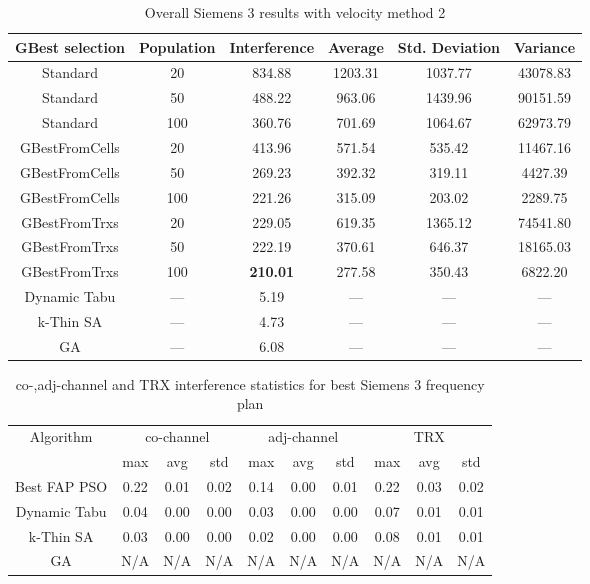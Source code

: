 \begin{table}[H]
\centering
	\begin{tabular}{cccccc}
	\toprule
    GBest selection & Population & Interference & Average & Std. Deviation & Variance \\
    \midrule
    Standard & 20 & 834.88 & 1203.31 & 1037.77 & 43078.83\\
    Standard & 50 & 488.22 & 963.06 & 1439.96 & 90151.59\\
    Standard & 100 & 360.76 & 701.69 & 1064.67 & 62973.79\\
    GBestFromCells & 20 & 413.96 & 571.54 & 535.42 & 11467.16\\
    GBestFromCells & 50 & 269.23 & 392.32 & 319.11 & 4427.39\\
    GBestFromCells & 100 & 221.26 & 315.09 & 203.02 & 2289.75\\
    GBestFromTrxs & 20 & 229.05 & 619.35 & 1365.12 & 74541.80\\
    GBestFromTrxs & 50 & 222.19 & 370.61 & 646.37 & 18165.03\\
    GBestFromTrxs & 100 & \textbf{210.01} & 277.58 & 350.43 & 6822.20\\
    \midrule
    Dynamic Tabu & --- & 5.19 & --- & --- & --- \\
    k-Thin SA & --- & 4.73 & --- & --- & --- \\
    GA & --- & 6.08 & --- & --- & --- \\
    \bottomrule
	\end{tabular}
\caption{Overall Siemens 3 results with velocity method 2}
\label{tab:siem3m2}
\end{table}
\begin{table}[H]
\centering
	\begin{tabular}{cccccccccc}
	\toprule
    Algorithm & \multicolumn{3}{c}{co-channel} & \multicolumn{3}{c}{adj-channel} & \multicolumn{3}{c}{TRX}\\
              & max & avg & std
              & max & avg & std
              & max & avg & std\\
    \midrule
    Best FAP PSO & 0.22 & 0.01 & 0.02 & 0.14 & 0.00 & 0.01 & 0.22 & 0.03 & 0.02 \\
    Dynamic Tabu & 0.04 & 0.00 & 0.00 & 0.03 & 0.00 & 0.00 & 0.07 & 0.01 & 0.01\\
    k-Thin SA & 0.03 & 0.00 & 0.00 & 0.02 & 0.00 & 0.00 & 0.08 & 0.01 & 0.01\\
    GA & \scriptsize{N/A} & \scriptsize{N/A} & \scriptsize{N/A} & \scriptsize{N/A} & \scriptsize{N/A} & \scriptsize{N/A} & \scriptsize{N/A} & \scriptsize{N/A} & \scriptsize{N/A}\\
    \bottomrule
	\end{tabular}
\caption{co-,adj-channel and TRX interference statistics for best Siemens 3 frequency plan}
\label{tab:stats-siem3m1}
\end{table}
